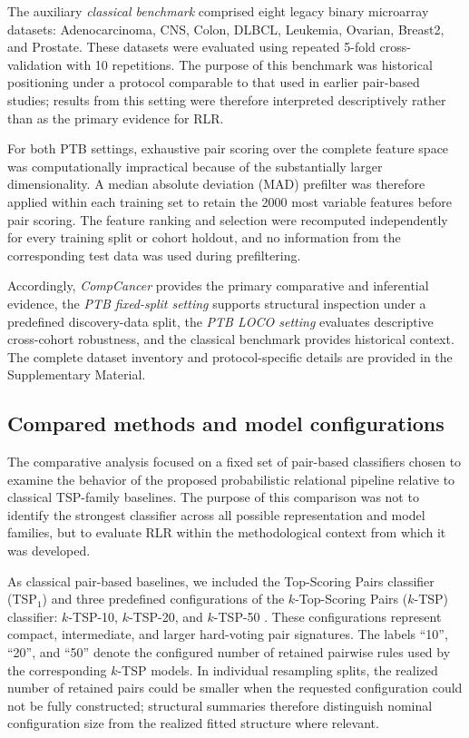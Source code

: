 \documentclass[journal]{IEEEtran}
\begin{document}
The auxiliary \emph{classical benchmark} comprised eight legacy binary microarray datasets: Adenocarcinoma, CNS, Colon, DLBCL, Leukemia, Ovarian, Breast2, and Prostate. These datasets were evaluated using repeated 5-fold cross-validation with 10 repetitions. The purpose of this benchmark was historical positioning under a protocol comparable to that used in earlier pair-based studies; results from this setting were therefore interpreted descriptively rather than as the primary evidence for RLR.

For both PTB settings, exhaustive pair scoring over the complete feature space was computationally impractical because of the substantially larger dimensionality. A median absolute deviation (MAD) prefilter was therefore applied within each training set to retain the 2000 most variable features before pair scoring. The feature ranking and selection were recomputed independently for every training split or cohort holdout, and no information from the corresponding test data was used during prefiltering.

Accordingly, \emph{CompCancer} provides the primary comparative and inferential evidence, the \emph{PTB fixed-split setting} supports structural inspection under a predefined discovery-data split, the \emph{PTB LOCO setting} evaluates descriptive cross-cohort robustness, and the classical benchmark provides historical context. The complete dataset inventory and protocol-specific details are provided in the Supplementary Material.

\subsection{Compared methods and model configurations}

The comparative analysis focused on a fixed set of pair-based classifiers chosen to examine the behavior of the proposed probabilistic relational pipeline relative to classical TSP-family baselines. The purpose of this comparison was not to identify the strongest classifier across all possible representation and model families, but to evaluate RLR within the methodological context from which it was developed.

As classical pair-based baselines, we included the Top-Scoring Pairs classifier (TSP$_1$) and three predefined configurations of the $k$-Top-Scoring Pairs ($k$-TSP) classifier: $k$-TSP-10, $k$-TSP-20, and $k$-TSP-50 \cite{Geman2004,Tan2005,Afsari2015}. These configurations represent compact, intermediate, and larger hard-voting pair signatures. The labels ``10'', ``20'', and ``50'' denote the configured number of retained pairwise rules used by the corresponding $k$-TSP models. In individual resampling splits, the realized number of retained pairs could be smaller when the requested configuration could not be fully constructed; structural summaries therefore distinguish nominal configuration size from the realized fitted structure where relevant.
\end{document}
